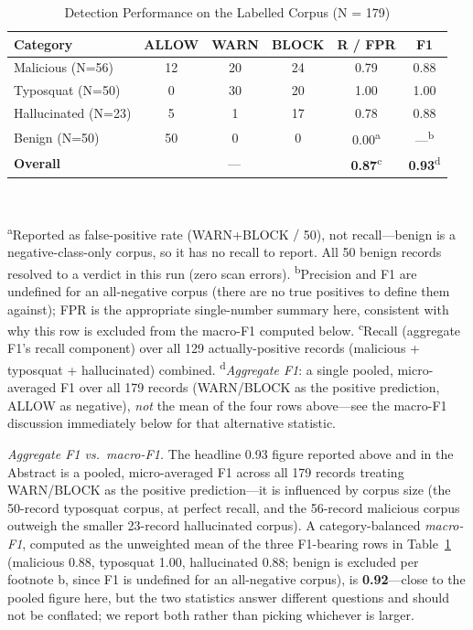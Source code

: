 \documentclass[journal]{IEEEtran}
\begin{document}
\begin{table}[t]
\caption{Detection Performance on the Labelled Corpus (N = 179)}
\label{tab:detection}
\centering
\begin{tabular}{@{}lccccc@{}}
\toprule
\textbf{Category} & \textbf{ALLOW} & \textbf{WARN} & \textbf{BLOCK} & \textbf{R / FPR} & \textbf{F1} \\
\midrule
Malicious (N=56)    & 12 & 20  & 24 & 0.79          & 0.88 \\
Typosquat (N=50)    & 0  & 30 & 20 & 1.00          & 1.00 \\
Hallucinated (N=23) & 5  & 1  & 17 & 0.78          & 0.88 \\
Benign (N=50)       & 50 & 0 & 0 & 0.00\textsuperscript{a} & ---\textsuperscript{b} \\
\midrule
\textbf{Overall}    & \multicolumn{3}{c}{---} & \textbf{0.87}\textsuperscript{c} & \textbf{0.93}\textsuperscript{d} \\
\bottomrule
\end{tabular}
\\[2pt]
\raggedright\footnotesize
\textsuperscript{a}Reported as false-positive rate (WARN+BLOCK $/$ 50), not recall---benign is a
negative-class-only corpus, so it has no recall to report. All 50 benign records resolved to a verdict in
this run (zero scan errors).
\textsuperscript{b}Precision and F1 are undefined for an all-negative corpus (there are no true positives to
define them against); FPR is the appropriate single-number summary here, consistent with why this row is
excluded from the macro-F1 computed below.
\textsuperscript{c}Recall (aggregate F1's recall component) over all 129 actually-positive records
(malicious + typosquat + hallucinated) combined.
\textsuperscript{d}\emph{Aggregate F1}: a single pooled, micro-averaged F1 over all 179 records (WARN/BLOCK
as the positive prediction, ALLOW as negative), \emph{not} the mean of the four rows above---see the
macro-F1 discussion immediately below for that alternative statistic.
\end{table}

\emph{Aggregate F1 vs.\ macro-F1.} The headline 0.93 figure reported above and in the Abstract is a pooled,
micro-averaged F1 across all 179 records treating WARN/BLOCK as the positive prediction---it is influenced by
corpus size (the 50-record typosquat corpus, at perfect recall, and the 56-record malicious corpus outweigh
the smaller 23-record hallucinated corpus). A category-balanced \emph{macro-F1}, computed as the unweighted
mean of the three F1-bearing rows in Table~\ref{tab:detection} (malicious 0.88, typosquat 1.00, hallucinated
0.88; benign is excluded per footnote b, since F1 is undefined for an all-negative corpus), is
\textbf{0.92}---close to the pooled figure here, but the two statistics answer different questions and should
not be conflated; we report both rather than picking whichever is larger.
\end{document}
